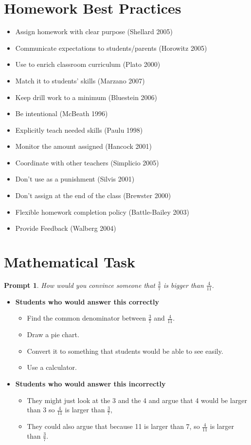 \documentclass{amsart}
\theoremstyle{theorem}\newtheorem{prompt}{Prompt}
\begin{document}
\section{Homework Best Practices}
\begin{itemize}
    \item Assign homework with clear purpose (Shellard 2005)
    \item Communicate expectations to students/parents (Horowitz 2005)
    \item Use to enrich classroom curriculum (Plato 2000)
    \item Match it to students' skills (Marzano 2007)
    \item Keep drill work to a minimum (Bluestein 2006)
    \item Be intentional (McBeath 1996)
    \item Explicitly teach needed skills (Paulu 1998)
    \item Monitor the amount assigned (Hancock 2001)
    \item Coordinate with other teachers (Simplicio 2005)
    \item Don't use as a punishment (Silvis 2001)
    \item Don't assign at the end of the class (Brewster 2000)
    \item Flexible homework completion policy (Battle-Bailey 2003)
    \item Provide Feedback (Walberg 2004)
\end{itemize}

\section{Mathematical Task}

\begin{prompt}
    How would you convince someone that $\frac{3}{7}$ is bigger than $\frac{4}{11}$.
\end{prompt}

\begin{itemize}
    \item \textbf{Students who would answer this correctly}
    \begin{itemize}
        \item Find the common denominator between $\frac{3}{7}$ and $\frac{4}{11}$.
        \item Draw a pie chart.
        \item Convert it to something that students would be able to see easily.
        \item Use a calculator.
    \end{itemize}
    \item \textbf{Students who would answer this incorrectly}
    \begin{itemize}
        \item They might just look at the 3 and the 4 and argue that 4 would be larger than 3 so $\frac{4}{11}$ is larger than $\frac{3}{7}$, 
        \item They could also argue that because 11 is larger than 7, so $\frac{4}{11}$ is larger than $\frac{3}{7}$.
    \end{itemize}
\end{itemize}
\end{document}
